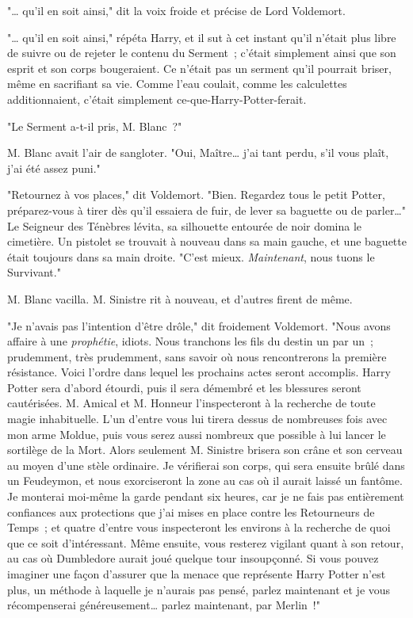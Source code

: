 "… qu'il en soit ainsi," dit la voix froide et précise de Lord Voldemort.

"… qu'il en soit ainsi," répéta Harry, et il sut à cet instant qu'il n'était plus libre de suivre ou de rejeter le contenu du Serment~; c'était simplement ainsi que son esprit et son corps bougeraient. Ce n'était pas un serment qu'il pourrait briser, même en sacrifiant sa vie. Comme l'eau coulait, comme les calculettes additionnaient, c'était simplement ce-que-Harry-Potter-ferait.

"Le Serment a-t-il pris, M. Blanc~?"

M. Blanc avait l'air de sangloter. "Oui, Maître… j'ai tant perdu, s'il vous plaît, j'ai été assez puni."

"Retournez à vos places," dit Voldemort. "Bien. Regardez tous le petit Potter, préparez-vous à tirer dès qu'il essaiera de fuir, de lever sa baguette ou de parler…" Le Seigneur des Ténèbres lévita, sa silhouette entourée de noir domina le cimetière. Un pistolet se trouvait à nouveau dans sa main gauche, et une baguette était toujours dans sa main droite. "C'est mieux. \emph{Maintenant}, nous tuons le Survivant."

M. Blanc vacilla. M. Sinistre rit à nouveau, et d'autres firent de même.

"Je n'avais pas l'intention d'être drôle," dit froidement Voldemort. "Nous avons affaire à une \emph{prophétie}, idiots. Nous tranchons les fils du destin un par un~; prudemment, très prudemment, sans savoir où nous rencontrerons la première résistance. Voici l'ordre dans lequel les prochains actes seront accomplis. Harry Potter sera d'abord étourdi, puis il sera démembré et les blessures seront cautérisées. M. Amical et M. Honneur l'inspecteront à la recherche de toute magie inhabituelle. L'un d'entre vous lui tirera dessus de nombreuses fois avec mon arme Moldue, puis vous serez aussi nombreux que possible à lui lancer le sortilège de la Mort. Alors seulement M. Sinistre brisera son crâne et son cerveau au moyen d'une stèle ordinaire. Je vérifierai son corps, qui sera ensuite brûlé dans un Feudeymon, et nous exorciseront la zone au cas où il aurait laissé un fantôme. Je monterai moi-même la garde pendant six heures, car je ne fais pas entièrement confiances aux protections que j'ai mises en place contre les Retourneurs de Temps~; et quatre d'entre vous inspecteront les environs à la recherche de quoi que ce soit d'intéressant. Même ensuite, vous resterez vigilant quant à son retour, au cas où Dumbledore aurait joué quelque tour insoupçonné. Si vous pouvez imaginer une façon d'assurer que la menace que représente Harry Potter n'est plus, un méthode à laquelle je n'aurais pas pensé, parlez maintenant et je vous récompenserai généreusement… parlez maintenant, par Merlin~!"

